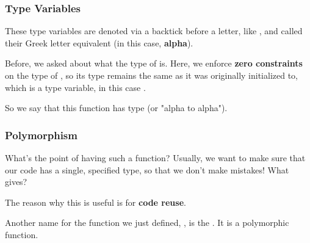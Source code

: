 \documentclass[aspectratio=169, handout]{beamer}
\begin{document}
\begin{frame}[fragile]
  \frametitle{Type Variables}

  These type variables are denoted via a backtick before a letter, like
  , and called their Greek letter equivalent (in this case, \textbf{alpha}).

  \pause
  \vspace{\fill}

  Before, we asked about what the type of  is. Here, we enforce
  \textbf{zero constraints} on the type of , so its type remains the same
  as it was originally initialized to, which is a type variable, in this case .

  \pause
  \vspace{\fill}

  So we say that this function has type  (or "alpha to alpha").
\end{frame}

\begin{frame}[fragile]
  \frametitle{Polymorphism}

  What's the point of having such a function? Usually, we want to make sure that
  our code has a single, specified type, so that we don't make mistakes! What gives?

  \pause
  \vspace{\fill}

  The reason why this is useful is for \textbf{code reuse}.

  \pause
  \vspace{\fill}


  \pause
  \vspace{\fill}

  Another name for the function we just defined, , is the
  . It is a polymorphic function.
\end{frame}
\end{document}
